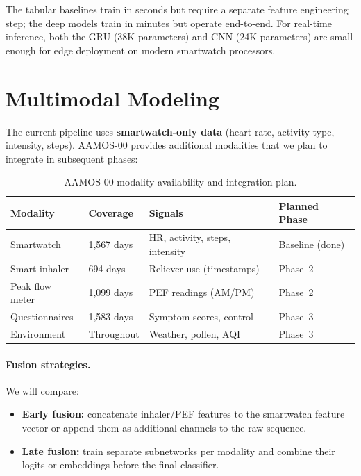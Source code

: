 \documentclass[11pt,a4paper]{article}
\begin{document}
The tabular baselines train in seconds but require a separate feature
engineering step; the deep models train in minutes but operate end-to-end.  For
real-time inference, both the GRU (38K parameters) and CNN (24K parameters) are
small enough for edge deployment on modern smartwatch processors.

\section{Multimodal Modeling}\label{sec:multimodal}

The current pipeline uses \textbf{smartwatch-only data} (heart rate, activity
type, intensity, steps).  AAMOS-00 provides additional modalities that we plan
to integrate in subsequent phases:

\begin{table}[H]
\centering
\caption{AAMOS-00 modality availability and integration plan.}
\label{tab:modalities}
\small
\begin{tabular}{llll}
\toprule
\textbf{Modality} & \textbf{Coverage} & \textbf{Signals} &
  \textbf{Planned Phase} \\
\midrule
Smartwatch       & 1{,}567 days & HR, activity, steps, intensity & Baseline (done) \\
Smart inhaler    & 694 days  & Reliever use (timestamps)       & Phase~2 \\
Peak flow meter  & 1{,}099 days & PEF readings (AM/PM)          & Phase~2 \\
Questionnaires   & 1{,}583 days & Symptom scores, control       & Phase~3 \\
Environment      & Throughout & Weather, pollen, AQI           & Phase~3 \\
\bottomrule
\end{tabular}
\end{table}

\paragraph{Fusion strategies.}
We will compare:
\begin{itemize}[nosep]
  \item \textbf{Early fusion:} concatenate inhaler/PEF features to the
        smartwatch feature vector or append them as additional channels to the
        raw sequence.
  \item \textbf{Late fusion:} train separate subnetworks per modality and
        combine their logits or embeddings before the final classifier.
\end{itemize}
\end{document}
